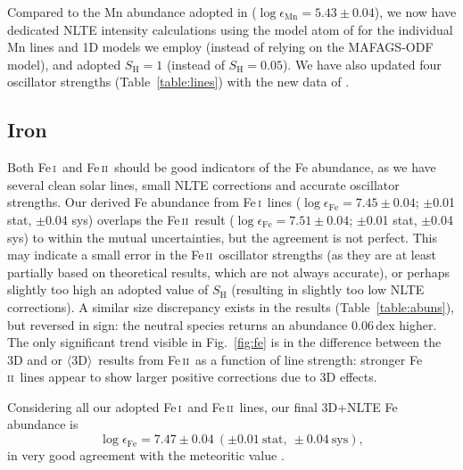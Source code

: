 \documentclass[traditabstract]{aa}
\newcommand{\oneDAV}{$\langle\mathrm{3D}\rangle$}
\newcommand{\altfei}{Fe\,\textsc{i}}
\newcommand{\altfeii}{Fe\,\textsc{ii}}
\newcommand{\fei}{\altfei\ }
\newcommand{\feii}{\altfeii\ }
\begin{document}
Compared to the Mn abundance adopted in  ($\log \epsilon_\mathrm{Mn}=5.43\pm0.04$), we now have dedicated NLTE intensity calculations using the model atom of \citet{Bergemann07} for the individual Mn lines and 1D models we employ (instead of relying on the MAFAGS-ODF model), and adopted $S_\mathrm{H}=1$ (instead of $S_\mathrm{H}=0.05$).  We have also updated four oscillator strengths (Table~\ref{table:lines}) with the new data of \citet{DenHartog11}.

\subsection{Iron}
\label{Feresults}

Both \fei and \feii should be good indicators of the Fe abundance, as we have several clean solar lines, small NLTE corrections and accurate oscillator strengths.  Our derived Fe abundance from \fei lines ($\log \epsilon_\mathrm{Fe}=7.45\pm0.04$; $\pm$0.01 stat, $\pm$0.04 sys) overlaps the \feii result ($\log \epsilon_\mathrm{Fe}=7.51\pm0.04$; $\pm$0.01 stat, $\pm$0.04 sys) to within the mutual uncertainties, but the agreement is not perfect.  This may indicate a small error in the \feii oscillator strengths (as they are at least partially based on theoretical results, which are not always accurate), or perhaps slightly too high an adopted value of $S_\mathrm{H}$ (resulting in slightly too low NLTE corrections).  A similar size discrepancy exists in the  results (Table~\ref{table:abuns}), but reversed in sign: the neutral species returns an abundance $0.06$\,dex higher.  The only significant trend visible in Fig.~\ref{fig:fe} is in the difference between the 3D and  or \oneDAV\ results from \feii as a function of line strength: stronger \feii lines appear to show larger positive corrections due to 3D effects.

Considering all our adopted \fei and \feii lines, our final 3D+NLTE Fe abundance is
\begin{displaymath}
\log \epsilon_\mathrm{Fe}=7.47\pm0.04\ (\pm0.01\ \mathrm{stat},\ \pm0.04\ \mathrm{sys}),
\end{displaymath}
in very good agreement with the meteoritic value \citep[$7.45\pm0.01$;][]{Lodders09}.
\end{document}
